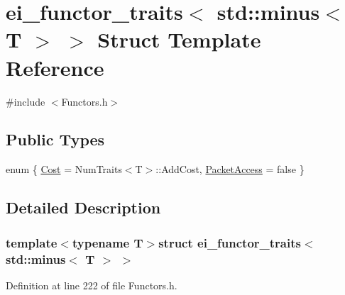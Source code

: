 \hypertarget{structei__functor__traits_3_01std_1_1minus_3_01_t_01_4_01_4}{\section{ei\-\_\-functor\-\_\-traits$<$ std\-:\-:minus$<$ T $>$ $>$ Struct Template Reference}
\label{structei__functor__traits_3_01std_1_1minus_3_01_t_01_4_01_4}
}


{\ttfamily \#include $<$Functors.\-h$>$}

\subsection*{Public Types}
\begin{DoxyCompactItemize}
\item 
enum \{ \hyperlink{structei__functor__traits_3_01std_1_1minus_3_01_t_01_4_01_4_a17701a375ac9c699d8b70c103372b4daa7a97d89f0eede28eefe9e386a33b7140}{Cost} = Num\-Traits$<$T$>$\-:\-:Add\-Cost, 
\hyperlink{structei__functor__traits_3_01std_1_1minus_3_01_t_01_4_01_4_a17701a375ac9c699d8b70c103372b4daa097d77aa116dbe0058755e04228f9dab}{Packet\-Access} = false
 \}
\end{DoxyCompactItemize}


\subsection{Detailed Description}
\subsubsection*{template$<$typename T$>$struct ei\-\_\-functor\-\_\-traits$<$ std\-::minus$<$ T $>$ $>$}



Definition at line 222 of file Functors.\-h.



